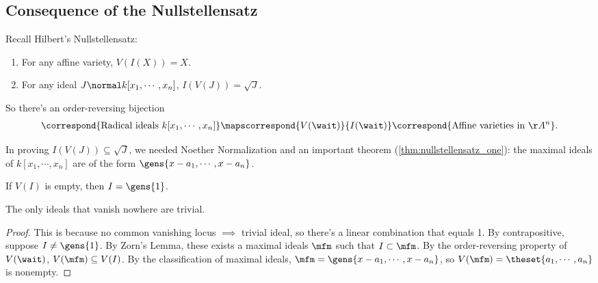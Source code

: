 \hypertarget{consequence-of-the-nullstellensatz}{%
\subsection{Consequence of the
Nullstellensatz}\label{consequence-of-the-nullstellensatz}}

Recall Hilbert's Nullstellensatz:

\begin{enumerate}
\def\labelenumi{\alph{enumi}.}
\item
  For any affine variety, \(V(I(X)) = X\).
\item
  For any ideal \(J\normal k[x_1, \cdots, x_n]\),
  \(I(V(J)) = \sqrt{J}\).
\end{enumerate}

So there's an order-reversing bijection
\begin{align*}  
\correspond{\text{Radical ideals } k[x_1, \cdots, x_n]} 
\mapscorrespond{V(\wait)}{I(\wait)}
\correspond{\text{Affine varieties in } \AA^n}
.\end{align*}

In proving \(I(V(J)) \subseteq \sqrt{J}\), we needed Noether
Normalization and an important theorem (\cref{thm:nullstellensatz_one}):
the maximal ideals of \(k[x_1, \cdots, x_n]\) are of the form
\(\gens{x-a_1, \cdots, x-a_n}\).

\begin{corollary}[?]

If \(V(I)\) is empty, then \(I = \gens{1}\).

\end{corollary}

\begin{slogan}

The only ideals that vanish nowhere are trivial.

\end{slogan}

\begin{proof}

This is because no common vanishing locus \(\implies\) trivial ideal, so
there's a linear combination that equals 1. By contrapositive, suppose
\(I\neq \gens{1}\). By Zorn's Lemma, these exists a maximal ideals
\(\mfm\) such that \(I \subset \mfm\). By the order-reversing property
of \(V(\wait)\), \(V(\mfm) \subseteq V(I)\). By the classification of
maximal ideals, \(\mfm = \gens{x-a_1, \cdots, x-a_n}\), so
\(V(\mfm) = \theset{a_1, \cdots, a_n}\) is nonempty.

\end{proof}

